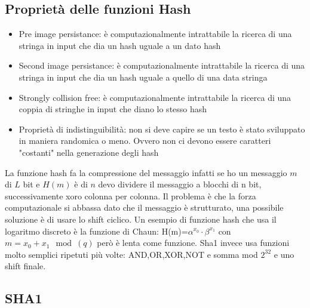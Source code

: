 \documentclass[10pt,a4paper]{article}
\begin{document}
\subsection{Proprietà delle funzioni Hash}
\begin{itemize}
\item Pre image persistance: è computazionalmente intrattabile la ricerca di una stringa in input che dia un hash uguale a un dato hash
\item Second image persistance: è computazionalmente intrattabile la ricerca di una stringa in input che dia un hash uguale a quello di una data stringa
\item Strongly collision free: è computazionalmente intrattabile la ricerca di una coppia di stringhe in input che diano lo stesso hash
\item Proprietà di indistinguibilità: non si deve capire se un testo è stato sviluppato in maniera randomica o meno. Ovvero non ci devono essere caratteri "costanti" nella generazione degli hash
\end{itemize}

La funzione hash fa la compressione del messaggio infatti se ho un messaggio $m$ di $L$ bit e $H(m)$ è di $n$ devo dividere il messaggio a blocchi di n bit, successivamente  xoro colonna per colonna. Il problema è che la forza computazionale si abbassa dato che il messaggio è strutturato, una possibile soluzione è di usare lo shift ciclico. Un esempio di funzione hash che usa il logaritmo discreto è la funzione di Chaun: H(m)=$\alpha^{x_0}\cdot\beta^{x_1}$ con $m=x_0+x_1\mod(q)$ però è lenta come funzione. Sha1 invece usa funzioni molto semplici ripetuti più volte: AND,OR,XOR,NOT e somma mod $2^{32}$ e uno shift finale.

\subsection{SHA1}
\end{document}

